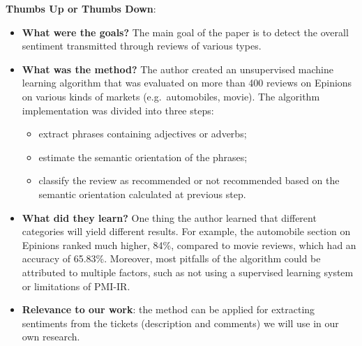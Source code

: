 \documentclass{mprop}
\begin{document}
\textbf{Thumbs Up or Thumbs Down}\cite{turney2002thumbs}:
\begin{itemize}
  \item \textbf{What were the goals?}
    The main goal of the paper is to detect the overall sentiment transmitted
    through reviews of various types.
  \item \textbf{What was the method?}
    The author created an unsupervised machine learning algorithm that was 
    evaluated on more than 400 reviews on Epinions on various kinds of markets 
    (e.g.\ automobiles, movie). The algorithm implementation was divided 
    into three steps:
      \begin{itemize}
        \item extract phrases containing adjectives or adverbs;
        \item estimate the semantic orientation of the phrases;
        \item classify the review as recommended or not recommended based on
          the semantic orientation calculated at previous step.
      \end{itemize}
  \item \textbf{What did they learn?}
    One thing the author learned that different categories will yield different 
    results. For example, the automobile section on Epinions ranked much higher, 
    84\%, compared to movie reviews, which had an accuracy of 65.83\%. Moreover, 
    most pitfalls of the algorithm could be attributed to multiple factors, such 
    as not using a supervised learning system or limitations of PMI-IR.
  \item \textbf{Relevance to our work}: the method can be applied for extracting
    sentiments from the tickets (description and comments) we will use 
    in our own research.
\end{itemize}
\end{document}
